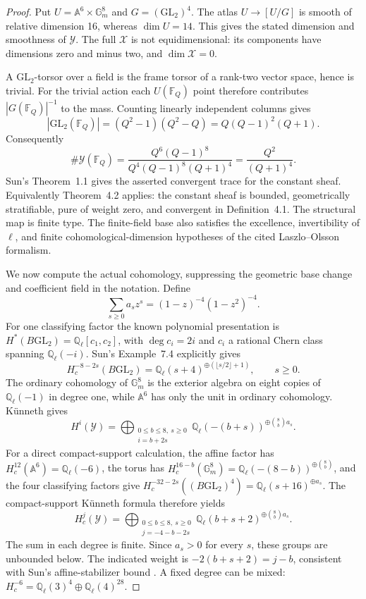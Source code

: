 \documentclass[11pt,a4paper]{article}
\newcommand{\Q}{\mathbb Q}\newcommand{\Z}{\mathbb Z}\newcommand{\C}{\mathbb C}\newcommand{\N}{\mathbb N}\newcommand{\F}{\mathbb F}
\newcommand{\A}{\mathbb A}\newcommand{\PP}{\mathbb P}\newcommand{\GL}{\mathrm{GL}}
\theoremstyle{named}\newtheorem{finding}{Finding}[section]
\theoremstyle{definition}\newtheorem{definition}[finding]{Definition}
\theoremstyle{remark}\newtheorem{remark}[finding]{Remark}
\begin{document}
\begin{proof}
Put $U=\A^6\times\mathbb G_m^8$ and $G=(\GL_2)^4$.
The atlas $U\to[U/G]$ is smooth of relative dimension 16, whereas
$\dim U=14$. This gives the stated dimension and smoothness of
$\mathcal Y$. The full $\mathcal X$ is not equidimensional: its
components have dimensions zero and minus two, and $\dim\mathcal X=0$.

A $\GL_2$-torsor over a field is the frame torsor of a rank-two
vector space, hence is trivial. For the trivial action each
$U(\F_Q)$ point therefore contributes $|G(\F_Q)|^{-1}$ to the mass.
Counting linearly independent columns gives
\[
 |\GL_2(\F_Q)|=(Q^2-1)(Q^2-Q)=Q(Q-1)^2(Q+1).
\]
Consequently
\[
 \#\mathcal Y(\F_Q)
 =\frac{Q^6(Q-1)^8}{Q^4(Q-1)^8(Q+1)^4}
 =\frac{Q^2}{(Q+1)^4}.
\]
Sun's Theorem~1.1 gives the asserted convergent trace for the constant
sheaf. Equivalently Theorem~4.2 applies: the constant sheaf is
bounded, geometrically stratifiable, pure of weight zero, and
convergent in Definition~4.1. The structural map is finite type.
The finite-field base also satisfies the excellence, invertibility
of $\ell$, and finite cohomological-dimension hypotheses of the
cited Laszlo--Olsson formalism.

We now compute the actual cohomology, suppressing the geometric
base change and coefficient field in the notation. Define
\[
 \sum_{s\ge0}a_s z^s=(1-z)^{-4}(1-z^2)^{-4}.
\]
For one classifying factor the known polynomial presentation is
$H^*(B\GL_2)=\Q_\ell[c_1,c_2]$, with $\deg c_i=2i$ and
$c_i$ a rational Chern class spanning $\Q_\ell(-i)$.
Sun's Example~7.4 explicitly gives
\[
 H_c^{-8-2s}(B\GL_2)
 =\Q_\ell(s+4)^{\oplus(\lfloor s/2\rfloor+1)},\qquad s\ge0.
\]
The ordinary cohomology of $\mathbb G_m^8$ is the exterior
algebra on eight copies of $\Q_\ell(-1)$ in degree one, while
$\A^6$ has only the unit in ordinary cohomology. K\"unneth gives
\begin{equation}\label{eq:stackordinarygroups}
 H^i(\mathcal Y)=
 \bigoplus_{\substack{0\le b\le8,\ s\ge0\\i=b+2s}}
 \Q_\ell(-(b+s))^{\oplus\binom8b a_s}.
\end{equation}
For a direct compact-support calculation, the affine factor has
$H_c^{12}(\A^6)=\Q_\ell(-6)$, the torus has
$H_c^{16-b}(\mathbb G_m^8)=\Q_\ell(-(8-b))^{\oplus\binom8b}$,
and the four classifying factors give
$H_c^{-32-2s}((B\GL_2)^4)=\Q_\ell(s+16)^{\oplus a_s}$.
The compact-support K\"unneth formula therefore yields
\begin{equation}\label{eq:stackcompactgroups}
 H_c^j(\mathcal Y)=
 \bigoplus_{\substack{0\le b\le8,\ s\ge0\\j=-4-b-2s}}
 \Q_\ell(b+s+2)^{\oplus\binom8b a_s}.
\end{equation}
The sum in each degree is finite. Since $a_s>0$ for every $s$,
these groups are unbounded below. The indicated weight is
$-2(b+s+2)=j-b$, consistent with Sun's affine-stabilizer bound
\cite[Theorem~1.4, p.~50]{SunStacks}. A fixed degree can be mixed:
$H_c^{-6}=\Q_\ell(3)^4\oplus\Q_\ell(4)^{28}$.


\end{proof}
\end{document}
